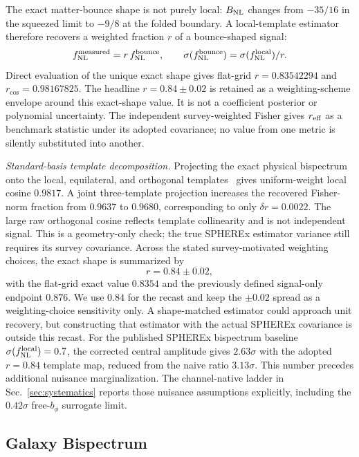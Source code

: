 \documentclass[aps,prd,twocolumn,superscriptaddress,showpacs,preprintnumbers,nofootinbib,longbibliography,floatfix]{revtex4-2}
\newcommand{\fnl}{f_{\rm NL}}
\newcommand{\BNL}{B_{\rm NL}}
\begin{document}
The exact matter-bounce shape is not purely local: $\BNL$ changes from $-35/16$ in the squeezed limit to $-9/8$ at the folded boundary. A local-template estimator therefore recovers a weighted fraction $r$ of a bounce-shaped signal:
\begin{equation}
\fnl^{\rm measured}=r\,\fnl^{\rm bounce},\qquad
\sigma(\fnl^{\rm bounce})=\sigma(\fnl^{\rm local})/r .
\label{eq:projection}
\end{equation}
Direct evaluation of the unique exact shape gives flat-grid $r=0.83542294$ and $r_{\cos}=0.98167825$. The headline $r=0.84\pm0.02$ is retained as a weighting-scheme envelope around this exact-shape value. It is not a coefficient posterior or polynomial uncertainty. The independent survey-weighted Fisher gives $r_{\rm eff}$ as a benchmark statistic under its adopted covariance; no value from one metric is silently substituted into another.
\par \emph{Standard-basis template decomposition.} Projecting the exact physical bispectrum onto the local, equilateral, and orthogonal templates~\cite{Senatore:2010} gives uniform-weight local cosine $0.9817$. A joint three-template projection increases the recovered Fisher-norm fraction from $0.9637$ to $0.9680$, corresponding to only $\delta r=0.0022$. The large raw orthogonal cosine reflects template collinearity and is not independent signal. This is a geometry-only check; the true SPHEREx estimator variance still requires its survey covariance.
Across the stated survey-motivated weighting choices, the exact shape is summarized by
\begin{equation}
r=0.84\pm0.02 ,
\label{eq:r_noise}
\end{equation}
with the flat-grid exact value $0.8354$ and the previously defined signal-only endpoint $0.876$. We use $0.84$ for the recast and keep the $\pm0.02$ spread as a weighting-choice sensitivity only. A shape-matched estimator could approach unit recovery, but constructing that estimator with the actual SPHEREx covariance is outside this recast.
For the published SPHEREx bispectrum baseline $\sigma(\fnl^{\rm local})=0.7$, the corrected central amplitude gives $2.63\sigma$ with the adopted $r=0.84$ template map, reduced from the naive ratio $3.13\sigma$. This number precedes additional nuisance marginalization. The channel-native ladder in Sec.~\ref{sec:systematics} reports those nuisance assumptions explicitly, including the $0.42\sigma$ free-$b_\phi$ surrogate limit.

\subsection{Galaxy Bispectrum}
\end{document}
